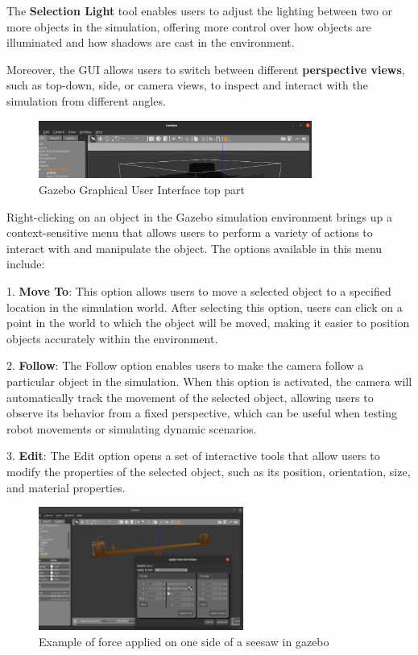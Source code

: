 \documentclass[../../main]{subfiles}
\begin{document}
The \textbf{Selection Light} tool enables users to adjust the lighting between 
two or more objects in the simulation, offering more control over how objects are 
illuminated and how shadows are cast in the environment. 

Moreover, the GUI allows users to switch between different \textbf{perspective views}, 
such as top-down, side, or camera views, to inspect and interact with the simulation 
from different angles. 

\begin{figure}[H]
    \centering
\includegraphics[width=0.8\textwidth]{fig/gui_top_part.png}
\caption{Gazebo Graphical User Interface top part}
\label{Top part} %
\end{figure}

Right-clicking on an object in the Gazebo simulation environment brings up a context-sensitive 
menu that allows users to perform a variety of actions to interact with and manipulate the object. 
The options available in this menu include:

1. \textbf{Move To}: This option allows users to move a selected object to a specified location 
in the simulation world. After selecting this option, users can click on a point in the world to 
which the object will be moved, making it easier to position objects accurately within the 
environment.

2. \textbf{Follow}: The Follow option enables users to make the camera follow a particular 
object in the simulation. When this option is activated, the camera will automatically track 
the movement of the selected object, allowing users to observe its behavior from a fixed 
perspective, which can be useful when testing robot movements or simulating dynamic 
scenarios.

3. \textbf{Edit}: The Edit option opens a set of interactive tools that allow users to modify 
the properties of the selected object, such as its position, orientation, size, and material 
properties.

\begin{figure}[H]
    \centering
\includegraphics[width=0.6\textwidth]{fig/seesaw_example.png}
\caption{Example of force applied on one side of a seesaw in gazebo}
\label{Seesaw} %
\end{figure}
\end{document}
